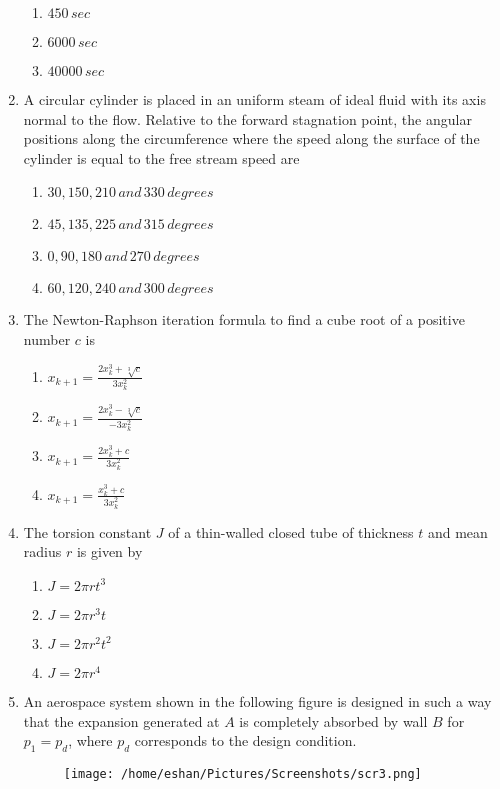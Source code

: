 \documentclass[journal]{IEEEtran}
\begin{document}
\begin{enumerate}
\begin{enumerate}
        \item $450\,sec$
        \item $6000\,sec$
        \item $40000\,sec$
    \end{enumerate}
    \item A circular cylinder is placed in an uniform steam of ideal fluid with its axis normal to the flow. Relative to the forward stagnation point, the angular positions along the circumference where the speed along the surface of the cylinder is equal to the free stream speed are 
    \begin{enumerate}
        \item $30,150,210\,and\,330\,degrees$
        \item $45,135,225\,and\,315\,degrees$
        \item $0,90,180\,and\,270\,degrees$
        \item $60,120,240\,and\,300\,degrees$
    \end{enumerate}
    \item The Newton-Raphson iteration formula to find a cube root of a positive number $c$ is
    \begin{enumerate}
        \item $x_{k+1}=\frac{2x_k^3+\sqrt[3]{c}}{3x_k^2}$
        \item $x_{k+1}=\frac{2x_k^3-\sqrt[3]{c}}{-3x_k^2}$
        \item $x_{k+1}=\frac{2x_k^3+c}{3x_k^2}$
        \item $x_{k+1}=\frac{x_k^3+c}{3x_k^2}$
    \end{enumerate}
    \item The torsion constant $J$ of a thin-walled closed tube of thickness $t$ and mean radius $r$ is given by
    \begin{enumerate}
        \item $J=2\pi rt^3$
        \item $J=2\pi r^3t$
        \item $J=2\pi r^2t^2$
        \item $J=2\pi r^4$
    \end{enumerate}
    \item An aerospace system shown in the following figure is designed in such a way that the expansion generated at $A$ is completely absorbed by  wall $B$ for $p_1=p_d$, where $p_d$ corresponds to the design condition.

    \begin{figure}[h]
    \centering
    \texttt{[image: /home/eshan/Pictures/Screenshots/scr3.png]} 
    \caption{}
    \label{}
\end{figure}


\end{enumerate}
\end{document}

